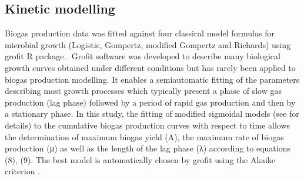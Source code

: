 \subsection{Kinetic modelling}
Biogas production data was fitted against four classical model formulas for microbial growth (Logistic, Gompertz, modified Gompertz and Richards) using grofit R package \cite{Kahm_2010}. Grofit software was developed to describe many biological growth curves obtained under different conditions but has rarely been applied to biogas production modelling. It enables a semiautomatic fitting of the parameters describing most growth processes which typically present a phase of slow gas production (lag phase) followed by a period of rapid gas production and then by a stationary phase. In this study, the fitting of modified sigmoidal models (see \cite{Zwietering1990} for details) to the cumulative biogas production curves  with respect to time allows the determination of maximum biogas yield (A), the maximum rate of biogas production (μ) as well as the length of the lag phase (λ) according to equations (8), (9). The best model is automatically chosen by grofit using the Akaike criterion \cite{Hasenbrink_2006}.